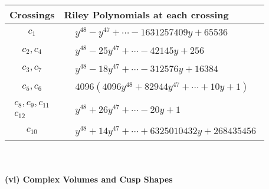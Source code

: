 \documentclass[1p]{elsarticle_modified}
\theoremstyle{definition}
\begin{document}
\begin{tabular}{m{50pt}|m{274pt}}
Crossings & \hspace{64pt}Riley Polynomials at each crossing \\
\hline $$\begin{aligned}c_{1}\end{aligned}$$&$\begin{aligned}
&y^{48}- y^{47}+\cdots-1631257409 y+65536
\end{aligned}$\\
\hline $$\begin{aligned}c_{2},c_{4}\end{aligned}$$&$\begin{aligned}
&y^{48}-25 y^{47}+\cdots-42145 y+256
\end{aligned}$\\
\hline $$\begin{aligned}c_{3},c_{7}\end{aligned}$$&$\begin{aligned}
&y^{48}-18 y^{47}+\cdots-312576 y+16384
\end{aligned}$\\
\hline $$\begin{aligned}c_{5},c_{6}\end{aligned}$$&$\begin{aligned}
&4096(4096 y^{48}+82944 y^{47}+\cdots+10 y+1)
\end{aligned}$\\
\hline $$\begin{aligned}c_{8},c_{9},c_{11}\\c_{12}\end{aligned}$$&$\begin{aligned}
&y^{48}+26 y^{47}+\cdots-20 y+1
\end{aligned}$\\
\hline $$\begin{aligned}c_{10}\end{aligned}$$&$\begin{aligned}
&y^{48}+14 y^{47}+\cdots+6325010432 y+268435456
\end{aligned}$\\
\hline
\end{tabular}\\~\\
\newpage\flushleft \textbf{(vi) Complex Volumes and Cusp Shapes}
\end{document}
